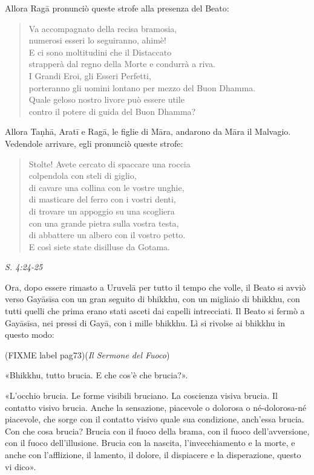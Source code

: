 Allora Ragā pronunciò queste strofe alla presenza del Beato:


\begin{quote}
Va accompagnato della recisa bramosia, \\
numerosi esseri lo seguiranno, ahimè! \\
E ci sono moltitudini che il Distaccato \\
strapperà dal regno della Morte e condurrà a riva. \\
I Grandi Eroi, gli Esseri Perfetti, \\
porteranno gli uomini lontano per mezzo del Buon Dhamma. \\
Quale geloso nostro livore può essere utile \\
contro il potere di guida del Buon Dhamma?
\end{quote}

Allora Taṇhā, Aratī e Ragā, le figlie di Māra, andarono da Māra il
Malvagio. Vedendole arrivare, egli pronunciò queste strofe:


\begin{quote}
Stolte! Avete cercato di spaccare una roccia \\
colpendola con steli di giglio, \\
di cavare una collina con le vostre unghie, \\
di masticare del ferro con i vostri denti, \\
di trovare un appoggio su una scogliera \\
con una grande pietra sulla vostra testa, \\
di abbattere un albero con il vostro petto. \\
E così siete state disilluse da Gotama.
\end{quote}

\emph{S. 4:24-25}


 Ora, dopo essere rimasto a Uruvelā per tutto il tempo che
volle, il Beato si avviò verso Gayāsīsa con un gran seguito di bhikkhu,
con un migliaio di bhikkhu, con tutti quelli che prima erano stati
asceti dai capelli intrecciati. Il Beato si fermò a Gayāsīsa, nei pressi
di Gayā, con i mille bhikkhu. Lì si rivolse ai bhikkhu in questo modo:


(FIXME label pag73)(\emph{Il Sermone del Fuoco})


«Bhikkhu, tutto brucia. E che cos’è che brucia?».


«L’occhio brucia. Le forme visibili bruciano. La coscienza visiva
brucia. Il contatto visivo brucia. Anche la sensazione, piacevole o
dolorosa o né-dolorosa-né piacevole, che sorge con il contatto visivo
quale sua condizione, anch’essa brucia. Con che cosa brucia? Brucia con
il fuoco della brama, con il fuoco dell’avversione, con il fuoco
dell’illusione. Brucia con la nascita, l’invecchiamento e la morte, e
anche con l’afflizione, il lamento, il dolore, il dispiacere e la
disperazione, questo vi dico».


